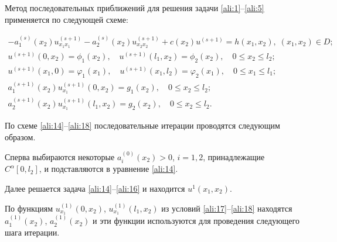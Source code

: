 


\smallskip




Метод последовательных приближений для решения задачи \eqref{ali:1}--\eqref{ali:5} применяется по следующей схеме:

\begin{gather}

\label{ali:14}

-a_1^{(s)}(x_2)u_{x_1x_1}^{(s+1)}-a_2^{(s)}(x_2)u_{x_2x_2}^{(s+1)}+c(x_2)u^{(s+1)}{=}h(x_1,x_2), \; (x_1,x_2)\in D;

\\

\label{ali:16}

u^{(s+1)}(0,x_2)=\phi_1(x_2), \quad u^{(s+1)}(l_1,x_2)=\phi_2(x_2), \quad 0\le x_2\le l_2;

\\

\label{ali:16}

u^{(s+1)}(x_1,0)=\varphi_1(x_1), \quad u^{(s+1)}(x_1,l_2)=\varphi_2(x_1), \quad 0\le x_1\le l_1;

\\

\label{ali:17}

a_1^{(s+1)}(x_2)u_{x_1}^{(s+1)}(0,x_2)=g_1(x_2), \quad 0\le x_2\le l_2;

\\

\label{ali:18}

a_2^{(s+1)}(x_2)u_{x_1}^{(s+1)}(l_1,x_2)=g_2(x_2), \quad 0\le x_2\le l_2.

\end{gather}



По схеме \eqref{ali:14}--\eqref{ali:18} последовательные итерации проводятся следующим образом. 

Сперва выбираются некоторые $a_{i}^{(0)}(x_2)>0$, $i=1, 2$, принадлежащие $C^\alpha[0,l_2]$, и подставляются в уравнение \eqref{ali:14}. 

Далее решается задача \eqref{ali:14}--\eqref{ali:16} и находится $u^{1}(x_1,x_2)$. 

По функциям $u_{x_1}^{(1)}(0,x_2)$, $u_{x_1}^{(1)}(l_1,x_2)$ из условий \eqref{ali:17}--\eqref{ali:18} находятся $a_1^{(1)}(x_2)$, $a_2^{(1)}(x_2)$ и эти функции используются для проведения следующего шага итерации. 



